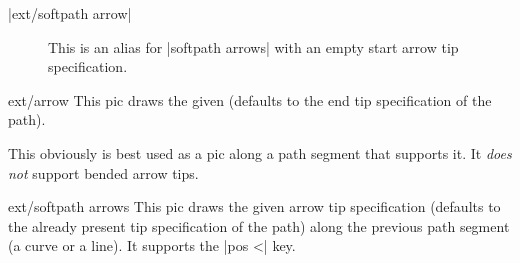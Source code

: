 \begin{multicols}{2}
\begin{description}
\item[|ext/softpath arrow|]
  This is an alias for |softpath arrows| with an empty start arrow tip specification.

\end{description}
\begin{pictype}{ext/arrow}{}
  This pic draws the given 
  (defaults to the end tip specification of the path).
  
  
  This obviously is best used as a pic along a path segment that supports it.
  It \emph{does not} support bended arrow tips.
\begin{codeexample}[preamble=\usetikzlibrary{bending, ext.arrows-plus}]
\end{codeexample}
\end{pictype}

\begin{pictype}{ext/softpath arrows}{}
  This pic draws the given arrow tip specification
  (defaults to the already present tip specification of the path)
  along the previous path segment (a curve or a line).
  It supports the |pos <| key.
  

\end{pictype}
\end{multicols}
